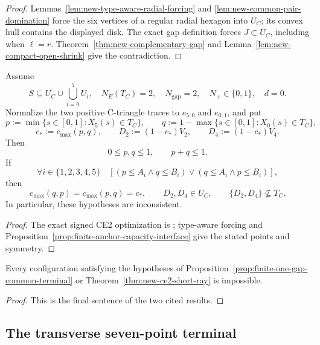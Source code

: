 \begin{proof}
Lemmas~\ref{lem:new-type-aware-radial-forcing} and
\ref{lem:new-common-pair-domination} force the six vertices of a regular
radial hexagon into $U_C$; its convex hull contains the displayed disk.  The
exact gap definition forces $J\subset U_C$, including when $\ell=r$.
Theorem~\ref{thm:new-complementary-gap} and
Lemma~\ref{lem:new-compact-open-shrink} give the contradiction.
\end{proof}

\begin{theorem}
\label{thm:new-ce2-short-ray}
Assume
\[
 S\subseteq U_C\cup\bigcup_{i=0}^5U_i,
 \quad N_E(T_C)=2,
 \quad N_{\mathrm{gap}}=2,
 \quad N_+\in\{0,1\},
 \quad d=0.
\]
Normalize the two positive C-triangle traces to $e_{5,0}$ and $e_{0,1}$, and
put
\[
 p:=\min\{s\in[0,1]:X_5(s)\in T_C\},
 \qquad
 q:=1-\max\{s\in[0,1]:X_0(s)\in T_C\},
\]
\[
 c_*:=c_{\max}(p,q),
 \qquad D_2:=(1-c_*)V_2,
 \qquad D_4:=(1-c_*)V_4.
\]
Then
\[
 0\le p,q\le1,
 \qquad p+q\le1.
\]
If
\[
 \forall i\in\{1,2,3,4,5\}\quad
 [(p\le A_i\land q\le B_i)\lor(q\le A_i\land p\le B_i)],
\]
then
\[
 c_{\max}(q,p)=c_{\max}(p,q)=c_*,
 \qquad D_2,D_4\in U_C,
 \qquad \{D_2,D_4\}\nsubseteq T_C.
\]
In particular, these hypotheses are inconsistent.
\end{theorem}

\begin{proof}
The exact signed CE2 optimization is ; type-aware
forcing and Proposition~\ref{prop:finite-anchor-capacity-interface} give the
stated points and symmetry.
\end{proof}



\begin{proposition}
\label{prop:new-nplus-zero-gap-closures}
Every configuration satisfying the hypotheses of
Proposition~\ref{prop:finite-one-gap-common-terminal} or
Theorem~\ref{thm:new-ce2-short-ray} is impossible.
\end{proposition}

\begin{proof}
This is the final sentence of the two cited results.
\end{proof}

\subsection{The transverse seven-point terminal}

